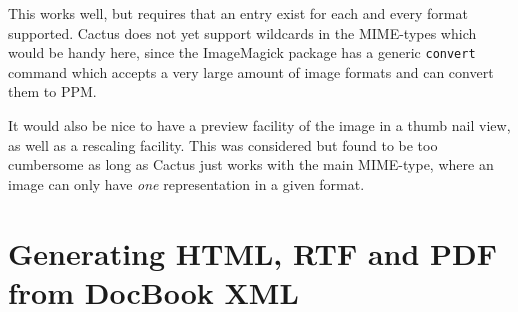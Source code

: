 This works well, but requires that an entry exist for each and every
format supported.  Cactus does not yet support wildcards in the
MIME-types which would be handy here, since the ImageMagick package
has a generic \texttt{convert} command which accepts a very large
amount of image formats and can convert them to PPM.

It would also be nice to have a preview facility of the image in a
thumb nail view, as well as a rescaling facility.  This was considered
but found to be too cumbersome as long as Cactus just works with the
main MIME-type, where an image can only have \textit{one}
representation in a given format.

\section{Generating HTML, RTF and PDF from DocBook XML}
\label{sec:xml-publishing}








